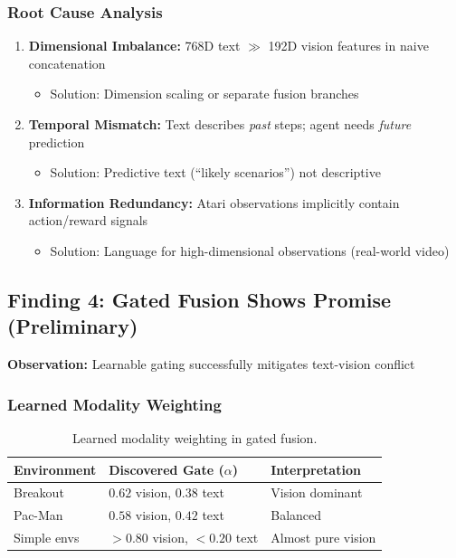 \documentclass[12pt,a4paper,openany]{report}
\begin{document}
\subsubsection{Root Cause Analysis}

\begin{enumerate}
    \item \textbf{Dimensional Imbalance:} 768D text $\gg$ 192D vision features in naive concatenation
        \begin{itemize}
            \item Solution: Dimension scaling or separate fusion branches
        \end{itemize}
    
    \item \textbf{Temporal Mismatch:} Text describes \textit{past} steps; agent needs \textit{future} prediction
        \begin{itemize}
            \item Solution: Predictive text (``likely scenarios'') not descriptive
        \end{itemize}
    
    \item \textbf{Information Redundancy:} Atari observations implicitly contain action/reward signals
        \begin{itemize}
            \item Solution: Language for high-dimensional observations (real-world video)
        \end{itemize}
\end{enumerate}

\subsection{Finding 4: Gated Fusion Shows Promise (Preliminary)}

\textbf{Observation:} Learnable gating successfully mitigates text-vision conflict

\subsubsection{Learned Modality Weighting}

\begin{table}[H]
\centering
\small
\begin{tabular}{lll}
\toprule
Environment & Discovered Gate ($\alpha$) & Interpretation \\
\midrule
Breakout & $0.62$ vision, $0.38$ text & Vision dominant \\
Pac-Man & $0.58$ vision, $0.42$ text & Balanced \\
Simple envs & $>0.80$ vision, $<0.20$ text & Almost pure vision \\
\bottomrule
\end{tabular}
\caption{Learned modality weighting in gated fusion.}
\end{table}
\end{document}
